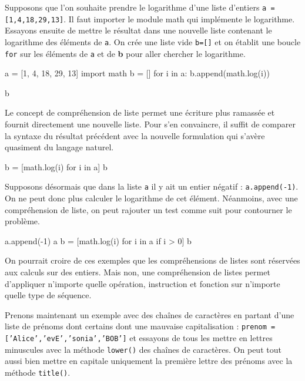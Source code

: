 Supposons que l'on souhaite prendre le logarithme d'une liste d'entiers \texttt{a = [1,4,18,29,13]}. Il faut importer le module math qui implémente le logarithme. Essayons ensuite de mettre le résultat dans une nouvelle liste contenant le logarithme des éléments de \texttt{a}. On crée une liste vide \texttt{b=[]} et on établit une boucle \texttt{for} sur les éléments de \texttt{a} et de \textbf{b} pour aller chercher le logarithme.

\begin{idleconsole*}
\begin{pyconsole}
a = [1, 4, 18, 29, 13]
import math
b = []
for i in a:
    b.append(math.log(i))

b
\end{pyconsole}
\end{idleconsole*}

Le concept de compréhension de liste permet une écriture plus ramassée et fournit directement une nouvelle liste. 
Pour s'en convaincre, il suffit de comparer la syntaxe du résultat précédent avec la nouvelle formulation qui s'avère quasiment du langage naturel.

\begin{idleconsole*}
\begin{pyconsole}
b = [math.log(i) for i in a]
b
\end{pyconsole}
\end{idleconsole*}

Supposons désormais que dans la liste \texttt{a} il y ait un entier négatif : \texttt{a.append(-1)}. On ne peut donc plus calculer le logarithme de cet élément. Néanmoins, avec une compréhension de liste, on peut rajouter un test comme suit pour contourner le problème.

\begin{idleconsole*}
\begin{pyconsole}
a.append(-1)
a
b = [math.log(i) for i in a if i > 0]
b
\end{pyconsole}
\end{idleconsole*}

On pourrait croire de ces exemples que les compréhensions de listes sont réservées aux calculs sur des entiers. 
Mais non, une compréhension de listes permet d'appliquer n'importe quelle opération, instruction et fonction sur n'importe quelle type de séquence.

Prenons maintenant un exemple avec des chaînes de caractères en partant d'une liste de prénoms dont certains dont une mauvaise capitalisation : \texttt{prenom = ['Alice','evE','sonia','BOB']} et essayons de tous les mettre en lettres minuscules avec la méthode \texttt{lower()} des chaînes de caractères. On peut tout aussi bien mettre en capitale uniquement la première lettre des prénoms avec la méthode \texttt{title()}.

